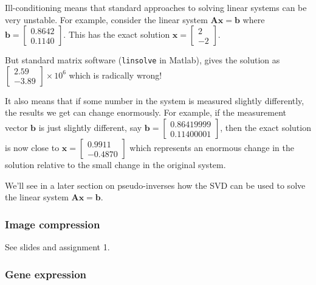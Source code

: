 Ill-conditioning  means that standard approaches to solving linear  systems can be very unstable.  For example, consider the  linear system $\mathbf{Ax} = \mathbf b$ where $\mathbf b = \left[\begin{array}{r} 0.8642 \\ 0.1140 \end{array}\right]$.  This has the exact solution $\mathbf x = \left[\begin{array}{r} 2 \\ -2 \end{array}\right]$. 

But standard matrix software ({\tt linsolve} in Matlab), gives the solution as $\left[\begin{array}{r} 2.59  \\ -3.89  \end{array}\right]\times 10^6$ which is radically wrong!

It also means that if some number in the system is measured slightly differently, the results we get can change enormously.  For example, if  the measurement vector $\mathbf b$ is just slightly different, say $\mathbf b = \left[\begin{array}{r} 0.86419999 \\ 0.11400001 \end{array}\right]$, then the exact solution is now close to $\mathbf x = \left[\begin{array}{r} 0.9911 \\ -0.4870 \end{array}\right]$ which represents an enormous change in the solution relative to the small change in the original system. \sqend






We'll see in a later section on pseudo-inverses how the SVD can be used to solve the linear system $\mathbf{Ax} = \mathbf b$.


\subsubsection{Image compression}

See slides and assignment 1.

\subsubsection{Gene expression}

